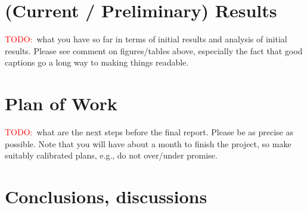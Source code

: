 \documentclass[11pt]{extarticle}
\newcommand{\todo}{\textcolor{red}{TODO:}~}
\begin{document}
\section{(Current / Preliminary) Results} 
\todo what you have so far in terms of initial results and analysis of initial results. Please see comment on figures/tables above, especially the fact that good captions go a long way to making things readable.

\section{Plan of Work} 
\todo what are the next steps before the final report. Please be as precise as possible. Note that you will have about a month to finish the project, so make suitably calibrated plans, e.g., do not over/under promise.

\section{Conclusions, discussions}



\end{document}
